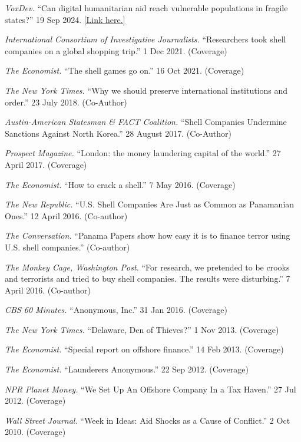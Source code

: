 \documentclass[10pt]{article}
\begin{document}
\begin{etaremune}
\item \textit{VoxDev.} ``Can digital humanitarian aid reach vulnerable populations in fragile states?'' 19 Sep 2024. \href{https://voxdev.org/topic/finance/can-digital-humanitarian-aid-reach-vulnerable-populations-fragile-states}{[Link here.]}
\item \textit{International Consortium of Investigative Journalists.} ``Researchers took shell companies on a global shopping trip.'' 1 Dec 2021. (Coverage)
\item \textit{The Economist.} ``The shell games go on.'' 16 Oct 2021. (Coverage)
\item \textit{The New York Times.} ``Why we should preserve international institutions and order.'' 23 July 2018. (Co-Author)
\item \textit{Austin-American Statesman \& FACT Coalition.} ``Shell Companies Undermine Sanctions Against North Korea.'' 28 August 2017. (Co-Author)
\item \textit{Prospect Magazine.} ``London: the money laundering capital of the world.'' 27 April 2017. (Coverage)
\item \textit{The Economist.} ``How to crack a shell.'' 7 May 2016. (Coverage)
\item \textit{The New Republic.} ``U.S. Shell Companies Are Just as Common as Panamanian Ones.'' 12 April 2016. (Co-author)
\item \textit{The Conversation.} ``Panama Papers show how easy it is to finance terror using U.S. shell companies.'' (Co-author)
\item \textit{The Monkey Cage, Washington Post.} ``For research, we pretended to be crooks and terrorists and tried to buy shell companies. The results were disturbing.'' 7 April 2016. (Co-author)
\item \textit{CBS 60 Minutes.} ``Anonymous, Inc.'' 31 Jan 2016. (Coverage)
\item \textit{The New York Times.} ``Delaware, Den of Thieves?'' 1 Nov 2013. (Coverage)
\item \textit{The Economist.} ``Special report on offshore finance.'' 14 Feb 2013. (Coverage)
\item \textit{The Economist.} ``Launderers Anonymous.'' 22 Sep 2012. (Coverage)
\item \textit{NPR Planet Money.} ``We Set Up An Offshore Company In a Tax Haven.'' 27 Jul 2012. (Coverage)
\item \textit{Wall Street Journal.} ``Week in Ideas: Aid Shocks as a Cause of Conflict.'' 2 Oct 2010. (Coverage)

\end{etaremune}
\end{document}
